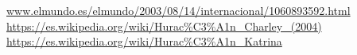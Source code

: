 \begin{thebibliography}{9}

  \url{www.elmundo.es/elmundo/2003/08/14/internacional/1060893592.html}
  \url{https://es.wikipedia.org/wiki/Hurac%C3%A1n_Charley_(2004)}
  \url{https://es.wikipedia.org/wiki/Hurac%C3%A1n_Katrina}

\end{thebibliography}